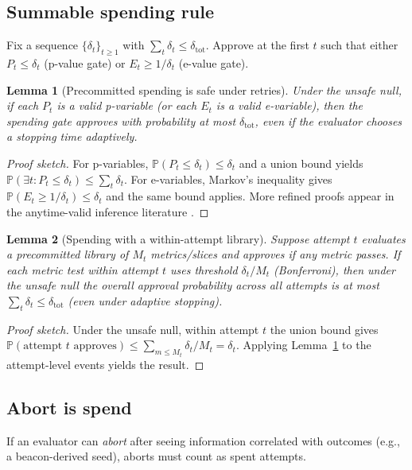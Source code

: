 \documentclass[11pt]{article}
\newtheorem{lemma}{Lemma}
\newcommand{\Pp}{\mathbb{P}}
\begin{document}
\subsection{Summable spending rule}
Fix a sequence $\{\delta_t\}_{t\ge 1}$ with $\sum_t \delta_t \le \delta_{\text{tot}}$.
Approve at the first $t$ such that either $P_t \le \delta_t$ (p-value gate) or $E_t \ge 1/\delta_t$ (e-value gate).

\begin{lemma}[Precommitted spending is safe under retries]\label{lem:precommit}
Under the unsafe null, if each $P_t$ is a valid p-variable (or each $E_t$ is a valid e-variable),
then the spending gate approves with probability at most $\delta_{\text{tot}}$, even if the evaluator chooses a stopping time adaptively.
\end{lemma}

\begin{proof}[Proof sketch]
For p-variables, $\Pp(P_t \le \delta_t)\le \delta_t$ and a union bound yields $\Pp(\exists t: P_t\le \delta_t)\le \sum_t \delta_t$.
For e-variables, Markov's inequality gives $\Pp(E_t \ge 1/\delta_t)\le \delta_t$ and the same bound applies.
More refined proofs appear in the anytime-valid inference literature \cite{ramdas2023gts_savi}.
\end{proof}

\begin{lemma}[Spending with a within-attempt library]\label{lem:within_attempt}
Suppose attempt $t$ evaluates a precommitted library of $M_t$ metrics/slices and approves if \emph{any} metric passes.
If each metric test within attempt $t$ uses threshold $\delta_t/M_t$ (Bonferroni), then under the unsafe null the overall approval probability across all attempts is at most $\sum_t \delta_t \le \delta_{\mathrm{tot}}$ (even under adaptive stopping).
\end{lemma}

\begin{proof}[Proof sketch]
Under the unsafe null, within attempt $t$ the union bound gives
$\Pp(\text{attempt $t$ approves}) \le \sum_{m\le M_t} \delta_t/M_t = \delta_t$.
Applying Lemma~\ref{lem:precommit} to the attempt-level events yields the result.
\end{proof}



\subsection{Abort is spend}
If an evaluator can \emph{abort} after seeing information correlated with outcomes (e.g., a beacon-derived seed),
aborts must count as spent attempts.
\end{document}
